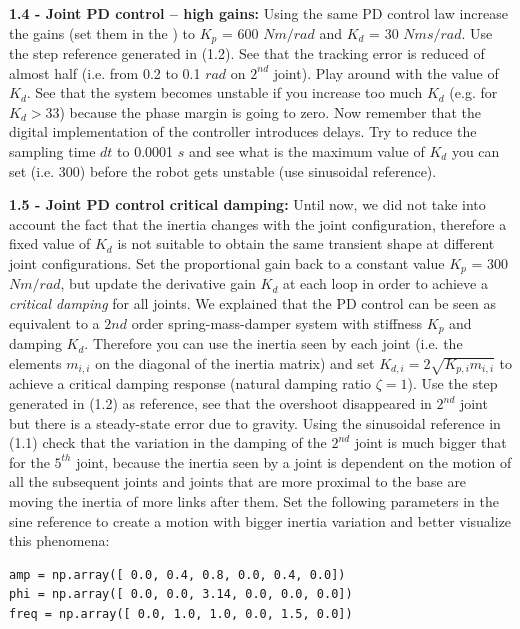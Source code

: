 \documentclass[11pt]{article}
\begin{document}
\quad

\noindent 
\textbf{1.4 - Joint PD control – high gains:}
Using the same PD control law increase the gains (set them in the ) to $K_p$ = 600 $Nm/rad$ and $K_d$ = 30 $Nms/rad$.  Use the step reference generated in (1.2). See that the tracking 
error is reduced of almost half (i.e. from 0.2 to 0.1 $rad$ on $2^{nd}$ joint). Play around with the value of $K_d$. See that the system becomes unstable if you 
increase too much $K_d$ (e.g. for $K_d>33$)  because the phase margin is going to zero. Now remember that the digital implementation of the controller introduces delays. Try to reduce the sampling time $dt$ to 0.0001 $s$ and see what is the maximum value of $K_d$ you can set (i.e. 300) before the robot gets unstable (use sinusoidal reference).

\quad

\noindent
\textbf{1.5 - Joint PD control critical damping:}
Until now, we did not take into account the fact that the inertia changes with the joint configuration, therefore a fixed value of $K_d$ is not suitable to obtain 
the same transient shape at different joint configurations. Set the proportional gain back to a constant value $K_p$ = 300 $Nm/rad$, but update the derivative gain 
$K_d$ at each loop in order to achieve a \textit{critical damping} for all  joints. We explained that the PD control can be seen as equivalent to a $2{nd}$ order 
spring-mass-damper system with stiffness $K_p$ and damping $K_d$. 
Therefore you can use the inertia seen by each joint (i.e. the elements $m_{i,i}$ on the diagonal 
of the inertia matrix) and set $K_{d,i} = 2\sqrt{K_{p,i} m_{i,i}}$ to achieve a critical damping response (natural damping ratio $\zeta = 1$). Use the step 
generated in (1.2) as reference, see that the overshoot disappeared in $2^{nd}$ joint but there is a steady-state error due to gravity. Using the sinusoidal 
reference in (1.1) %
check that the variation in the damping of the $2^{nd}$ joint is much bigger that for the $5^{th}$ joint, because the inertia seen by a joint  is dependent on the motion of all the subsequent joints and joints that are more proximal to the base are moving the inertia of more links after them.
Set the following parameters in the sine reference to create a motion with bigger inertia variation and better visualize this phenomena:


\begin{verbatim}
amp = np.array([ 0.0, 0.4, 0.8, 0.0, 0.4, 0.0])    
phi = np.array([ 0.0, 0.0, 3.14, 0.0, 0.0, 0.0])      
freq = np.array([ 0.0, 1.0, 1.0, 0.0, 1.5, 0.0])    
\end{verbatim}
\end{document}
